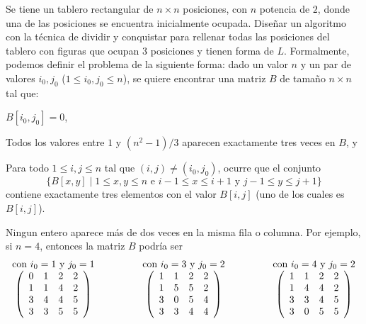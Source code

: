 
Se tiene un tablero rectangular de $n \times n$ posiciones, con $n$ potencia de $2$, donde una de las posiciones se encuentra inicialmente ocupada.  Diseñar un algoritmo con la técnica de dividir y conquistar para rellenar todas las posiciones del tablero con figuras que ocupan $3$ posiciones y tienen forma de $L$.  Formalmente, podemos definir el problema de la siguiente forma: dado un valor $n$ y un par de valores $i_0,j_0$ ($1 \leq i_0, j_0 \leq n$), se quiere encontrar una matriz $B$ de tamaño $n \times n$ tal que:
%
 \item $B[i_0,j_0] = 0$,
 \item Todos los valores entre $1$ y $(n^2-1)/3$ aparecen exactamente tres veces en $B$, y
 \item Para todo $1 \leq i,j \leq n$ tal que $(i,j) \neq (i_0,j_0)$, ocurre que el conjunto 
 \[\{B[x,y] \mid 1 \leq x,y \leq n \text{ e } i-1 \leq x \leq i+1 \text{ y }  j-1 \leq y \leq j+1\}\]
 contiene exactamente tres elementos con el valor $B[i,j]$ (uno de los cuales es $B[i,j]$).
 \item Ningun entero aparece más de dos veces en la misma fila o columna.
%
Por ejemplo, si $n = 4$, entonces la matriz $B$ podría ser
%
$$
\begin{array}{*5c}
\mbox{con $i_0=1$ y $j_0=1$} & \hspace{1cm} & \mbox{con $i_0=3$ y $j_0=2$} & \hspace{1cm} & \mbox{con $i_0=4$ y $j_0=2$} \\
\left(
\begin{array}{*4c}
0  & 1  & 2  & 2  \\
1  & 1  & 4  & 2  \\
3  & 4  & 4  & 5  \\
3  & 3  & 5  & 5 \\
\end{array}\right)
& &
\left(
\begin{array}{*4c}
1  & 1  & 2  & 2  \\
1  & 5  & 5  & 2  \\
3  & 0  & 5  & 4  \\
3  & 3  & 4  & 4 \\
\end{array}\right)
& &
\left(
\begin{array}{*4c}
1  & 1  & 2  & 2  \\
1  & 4  & 4  & 2  \\
3  & 3  & 4  & 5  \\
3  & 0  & 5  & 5 \\
\end{array}\right)
\end{array}
$$
